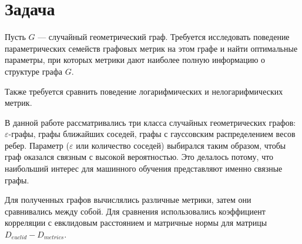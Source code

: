 \section{Задача} \label{sect1_2}

Пусть $G$ --- случайный геометрический граф. Требуется исследовать поведение параметрических семейств графовых метрик на этом графе и найти оптимальные параметры, при которых метрики дают наиболее полную информацию о структуре графа $G$.

Также требуется сравнить поведение логарифмических и нелогарифмических метрик.

В данной работе рассматривались три класса случайных геометрических графов: $\varepsilon$-графы, графы ближайших соседей, графы с гауссовским распределением весов ребер. Параметр ($\varepsilon$ или количество соседей) выбирался таким образом, чтобы граф оказался связным с высокой вероятностью. Это делалось потому, что наибольший интерес для машинного обучения представляют именно связные графы.

Для полученных графов вычислялись различные метрики, затем они сравнивались между собой. Для сравнения использовались коэффициент корреляции с евклидовым расстоянием и матричные нормы для матрицы $D_{euclid} - D_{metrics}$.






